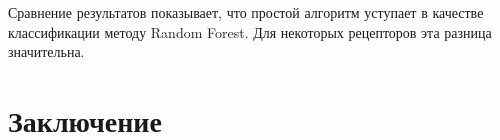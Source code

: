 \documentclass[12pt,twoside]{article}
\begin{document}
Сравнение результатов показывает, что простой алгоритм уступает в качестве классификации методу Random Forest. Для некоторых рецепторов эта разница значительна.

\section{Заключение}


\clearpage

\end{document}
